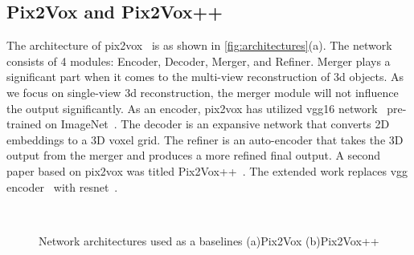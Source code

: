 \subsection{Pix2Vox and Pix2Vox++}\label{subsec:pix2vox-and-pix2vox++}
The architecture of pix2vox~\cite{Xie_2019} is as shown in \autoref{fig:architectures}(a).
The network consists of 4 modules: Encoder, Decoder, Merger, and Refiner.
Merger plays a significant part when it comes to the multi-view reconstruction of 3d objects.
As we focus on single-view 3d reconstruction, the merger module will not influence the output significantly.
As an encoder, pix2vox has utilized \gls{vgg}16 network~\cite{simonyan2015deep} pre-trained on ImageNet~\cite{Deng2009ImageNetAL}.
The decoder is an expansive network that converts 2D embeddings to a 3D voxel grid.
The refiner is an auto-encoder that takes the 3D output from the merger and produces a more refined final output.
A second paper based on pix2vox was titled Pix2Vox++~\cite{Xie_2020}.
The extended work replaces \gls{vgg} encoder~\cite{simonyan2015deep} with \gls{resnet}~\cite{He2016DeepRL}.


\begin{figure}[!ht]
    \centering
    \quad
    \\
    \caption{Network architectures used as a baselines (a)Pix2Vox (b)Pix2Vox++}
    \label{fig:architectures}
\end{figure}


